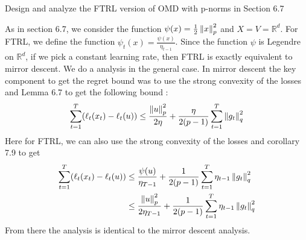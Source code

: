 \begin{exercise}[]{}
	Design and analyze the FTRL version of OMD with p-norms in Section 6.7
\end{exercise}

\begin{solution}[]
	As in section 6.7, we consider the function $ \psi(x) = \frac{1}{2} \left\|x\right\|_p^2 $ and $ X = V = \mathbb{R}^d $. For FTRL, we define the function $ \psi_t(x) = \frac{\psi(x)}{\eta_{t-1}} $. Since the function $ \psi $ is Legendre on $ \mathbb{R}^d $, if we pick a constant learning rate, then FTRL is exactly equivalent to mirror descent. We do a analysis in the general case.
In mirror descent the key component to get the regret bound was to use the strong convexity of the losses and Lemma 6.7 to get the following bound :
\begin{equation*}
	\sum_{t=1}^{T}(\ell_t(x_t)-\ell_t(u)) \leq \frac{\left\|u\right\|_p^2}{2 \eta} + \frac{\eta}{2(p-1)}\sum_{t=1}^{T}\left\|g_t\right\|_q^2
\end{equation*}
Here for FTRL, we can also use the strong convexity of the losses and corollary 7.9 to get 
\begin{align*}
	\sum_{t=1}^{T}(\ell_t(x_t)-\ell_t(u)) &\leq \frac{\psi(u)}{\eta_{T-1}} + \frac{1}{2(p-1)}\sum_{t=1}^{T} \eta_{t-1}\left\|g_t\right\|_q^2 \\
					      &\leq \frac{\left\|u\right\|_p^2}{2\eta_{T-1}} + \frac{1}{2(p-1)}\sum_{t=1}^{T} \eta_{t-1}\left\|g_t\right\|_q^2
\end{align*}
From there the analysis is identical to the mirror descent analysis.


\end{solution}

